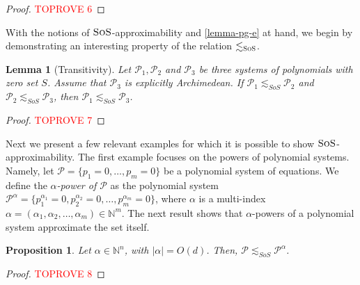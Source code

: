\documentclass[11pt]{article}
\newcommand{\sos}{\text{\sc{SoS}}}
\newcommand{\1}{\textbf{1}}
\newtheorem{lemma}[theorem]{Lemma}
\newtheorem{proposition}[theorem]{Proposition}
\begin{document}
\begin{proof}\textcolor{red}{TOPROVE 6}\end{proof}

With the notions of $\sos$-approximability and \cref{lemma-pg-e} at hand, we begin by demonstrating an interesting property of the relation $\lesssim_{\sos}$.

\begin{lemma}[Transitivity]\label{th:transitivity_of_approximations}
    Let $\mathcal{P}_1, \mathcal{P}_2$ and $\mathcal{P}_3$ be three systems of polynomials with zero set $S$. Assume that $\mathcal{P}_3$ is explicitly Archimedean. If $\mathcal{P}_1 \lesssim_{SoS} \mathcal{P}_2$ and $\mathcal{P}_2 \lesssim_{SoS} \mathcal{P}_3$, then $\mathcal{P}_1 \lesssim_{SoS} \mathcal{P}_3$.
\end{lemma}
\begin{proof}\textcolor{red}{TOPROVE 7}\end{proof}

Next we present a few relevant examples for which it is possible to show $\sos$-approximability. The first example focuses on the powers of polynomial systems. Namely, let $\mathcal{P} = \{p_1 = 0, \ldots, p_m = 0\}$ be a polynomial system of equations. We define the \emph{$\alpha$-power of $\mathcal{P}$} as the polynomial system $\mathcal{P}^{\alpha} = \{p_1^{\alpha_1} = 0, p_2^{\alpha_2} = 0, \ldots, p_m^{\alpha_m} =0\}$, where $\alpha$ is a multi-index $\alpha = (\alpha_1,\alpha_2, \ldots, \alpha_m) \in \mathbb{N}^m$. The next result shows that $\alpha$-powers of a polynomial system approximate the set itself.

\begin{proposition}\label{prop:alpha_powers}
    Let $\alpha\in \mathbb{N}^n$, with $|\alpha|=O(d)$. Then, $\mathcal P\lesssim_{SoS}\mathcal{P}^\alpha$.
\end{proposition}

\begin{proof}\textcolor{red}{TOPROVE 8}\end{proof}
\end{document}
